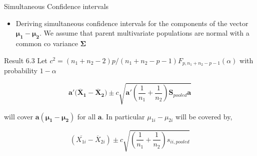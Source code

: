 \documentclass[8pt]{beamer}
\begin{document}
        \begin{frame}{Simultaneous Confidence intervals}
        \begin{itemize}
            \item Deriving simultaneous confidence intervals for the components of the vector $\mathbf{\mu_{1} - \mu_{2}}$. We assume that parent multivariate populations are normal with a common co variance $\mathbf{\Sigma}$
        \end{itemize}
        
        \begin{block}{Result 6.3}
            Let $c^{2} = (n_{1} + n_{2} - 2)p/(n_{1} + n_{2} - p - 1)F_{p,n_{1}+n_{2}-p-1}(\alpha)$ with probability $1 - \alpha$
            
            \begin{equation*}
                \mathbf{a'(\overline{X}_{1} - \overline{X}_{2}}) \pm c \sqrt{\mathbf{a}'\left(\frac{1}{n_{1}} + \frac{1}{n_{2}}\right)\mathbf{S}_{pooled}\mathbf{a} }
            \end{equation*}
            
            will cover $\mathbf{a}(\mathbf{\mu_{1} - \mu_{2}})$ for all $\mathbf{a}$. In particular $\mu_{1i} - \mu_{2i}$ will be covered by, 
            
            \begin{equation*}
                (\overline{X_{1i}} - \overline{X}_{2i}) \pm c\sqrt{\left(\frac{1}{n_{1}} + \frac{1}{n_{2}}\right)s_{ii,pooled}}
            \end{equation*}
        \end{block}
    
    \end{frame}
    
\end{document}
